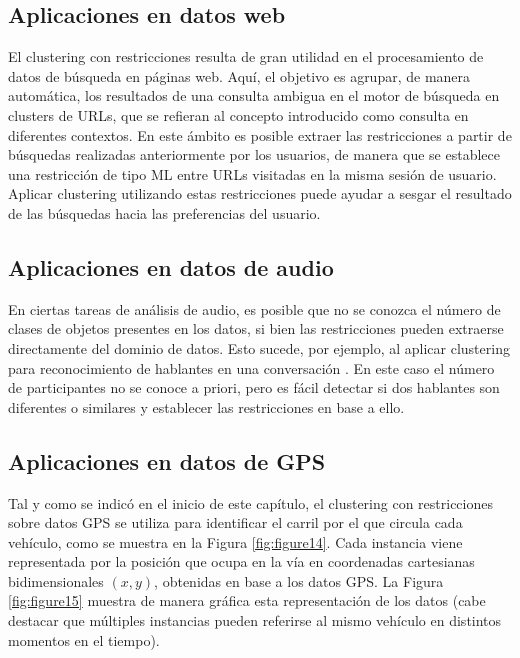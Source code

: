 \subsection{Aplicaciones en datos web} 

El clustering con restricciones resulta de gran utilidad en el procesamiento de datos de búsqueda en páginas web. Aquí, el objetivo es agrupar, de manera automática, los resultados de una consulta ambigua en el motor de búsqueda en clusters de \acs{URL}s, que se refieran al concepto introducido como consulta en diferentes contextos. En este ámbito es posible extraer las restricciones a partir de búsquedas realizadas anteriormente por los usuarios, de manera que se establece una restricción de tipo \acf{ML} entre \acs{URL}s visitadas en la misma sesión de usuario. Aplicar clustering utilizando estas restricciones puede ayudar a sesgar el resultado de las búsquedas hacia las preferencias del usuario.

\subsection{Aplicaciones en datos de audio}

En ciertas tareas de análisis de audio, es posible que no se conozca el número de clases de objetos presentes en los datos, si bien las restricciones pueden extraerse directamente del dominio de datos. Esto sucede, por ejemplo, al aplicar clustering para reconocimiento de hablantes en una conversación \cite{BarHillel:2003}. En este caso el número de participantes no se conoce a priori, pero es fácil detectar si dos hablantes son diferentes o similares y establecer las restricciones en base a ello.

\subsection{Aplicaciones en datos de GPS} \label{EjemploGPS}

Tal y como se indicó en el inicio de este capítulo, el clustering con restricciones sobre datos \acs{GPS} se utiliza para identificar el carril por el que circula cada vehículo, como se muestra en la Figura \ref{fig:figure14}. Cada instancia viene representada por la posición que ocupa en la vía en coordenadas cartesianas bidimensionales $(x,y)$, obtenidas en base a los datos \acs{GPS}. La Figura \ref{fig:figure15} muestra de manera gráfica esta representación de los datos (cabe destacar que múltiples instancias pueden referirse al mismo vehículo en distintos momentos en el tiempo).

